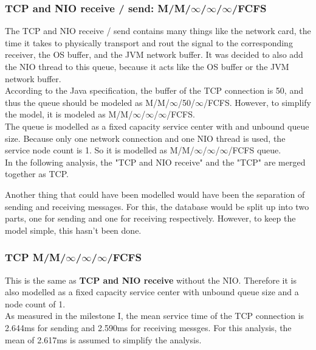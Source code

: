 \documentclass[a4paper]{article}
\begin{document}
{\subsubsection{TCP and NIO receive / send: M/M/$\infty$/$\infty$/$\infty$/FCFS}

The TCP and NIO receive / send contains many things like the network card, the time it takes to physically transport and rout the signal to the corresponding receiver, the OS buffer, and the JVM network buffer. It was decided to also add the NIO thread to this queue, because it acts like the OS buffer or the JVM network buffer.\\

\noindent According to the Java specification, the buffer of the TCP connection is 50, and thus the queue should be modeled as M/M/$\infty$/50/$\infty$/FCFS. However, to simplify the model, it is modeled as M/M/$\infty$/$\infty$/$\infty$/FCFS.\\

\noindent The queue is modelled as a fixed capacity service center with and unbound queue size. Because only one network connection and one NIO thread is used, the service node count is 1. So it is modelled as M/M/$\infty$/$\infty$/$\infty$/FCFS queue.\\

\noindent In the following analysis, the "TCP and NIO receive" and the "TCP" are merged together as TCP.

\noindent Another thing that could have been modelled would have been the separation of sending and receiving messages. For this, the database would be split up into two parts, one for sending and one for receiving respectively. However, to keep the model simple, this hasn't been done.


\subsubsection{TCP M/M/$\infty$/$\infty$/$\infty$/FCFS}

This is the same as \textbf{TCP and NIO receive} without the NIO. Therefore it is also modelled as a fixed capacity service center with unbound queue size and a node count of 1.\\

\noindent As measured in the milestone I, the mean service time of the TCP connection is 2.644ms for sending and 2.590ms for receiving messges. For this analysis, the mean of 2.617ms is assumed to simplify the analysis.\\

}
\end{document}
